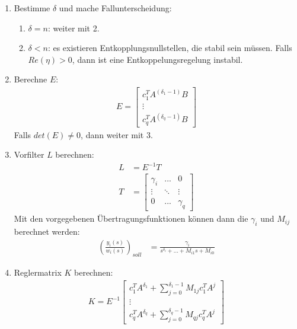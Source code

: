 \documentclass[a4paper,twocolumn,10pt]{article}
\begin{document}
\begin{enumerate}
\item Bestimme $\delta$ und mache Fallunterscheidung:
\begin{enumerate}[label=$\bullet$]
\item $\delta=n$: weiter mit 2.
\item $\delta<n$: es existieren Entkopplungsnullstellen, die stabil sein müssen. Falls $Re(\eta)>0$, dann ist eine Entkoppelungsregelung instabil.
\end{enumerate}
\item Berechne $E$:
\begin{align*}
E=\begin{bmatrix}c_1^TA^{(\delta_1-1)}B \\ \vdots \\ c_q^TA^{(\delta_q-1)}B\end{bmatrix}
\end{align*}
Falls $det(E)\neq 0$, dann weiter mit 3.
\item Vorfilter $L$ berechnen:
\begin{align*}
L&=E^{-1}T\\
T&=\begin{bmatrix}\gamma_i & ... & 0 \\ \vdots & \ddots & \vdots \\ 0 & ... & \gamma_q\end{bmatrix}
\end{align*}
Mit den vorgegebenen Übertragungsfunktionen können dann die $\gamma_i$ und $M_{ij}$ berechnet werden:
\begin{align*}
\left(\frac{y_i(s)}{w_i(s)}\right)_{soll}&=\frac{\gamma_i}{s^{\delta_i}+...+M_{i1}s+M_{i0}}
\end{align*}
\item Reglermatrix $K$ berechnen:
\begin{align*}
K=E^{-1}\begin{bmatrix}c_1^TA^{\delta_1}+\sum\limits_{j=0}^{\delta_1-1}M_{1j}c_1^TA^j \\ \vdots \\ c_q^TA^{\delta_q}+\sum\limits_{j=0}^{\delta_q-1}M_{qj}c_q^TA^j\end{bmatrix}
\end{align*}
\end{enumerate}
\end{document}
